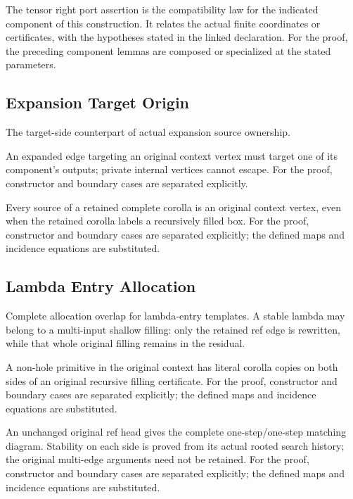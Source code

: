 The tensor right port assertion is the compatibility law for the indicated component of this construction. It relates the actual finite coordinates or certificates, with the hypotheses stated in the linked declaration.
For the proof, the preceding component lemmas are composed or specialized at the stated parameters.
\par{}

\subsection{Expansion Target Origin}
The target-side counterpart of actual expansion source ownership.

An expanded edge targeting an original context vertex must target one of its component's outputs; private internal vertices cannot escape.
For the proof, constructor and boundary cases are separated explicitly.
\par{}

Every source of a retained complete corolla is an original context vertex, even when the retained corolla labels a recursively filled box.
For the proof, constructor and boundary cases are separated explicitly; the defined maps and incidence equations are substituted.
\par{}

\subsection{Lambda Entry Allocation}
Complete allocation overlap for lambda-entry templates. A stable lambda may belong to a multi-input shallow filling: only the retained ref edge is rewritten, while that whole original filling remains in the residual.

A non-hole primitive in the original context has literal corolla copies on both sides of an original recursive filling certificate.
For the proof, constructor and boundary cases are separated explicitly; the defined maps and incidence equations are substituted.
\par{}

An unchanged original ref head gives the complete one-step/one-step matching diagram. Stability on each side is proved from its actual rooted search history; the original multi-edge arguments need not be retained.
For the proof, constructor and boundary cases are separated explicitly; the defined maps and incidence equations are substituted.
\par{}

